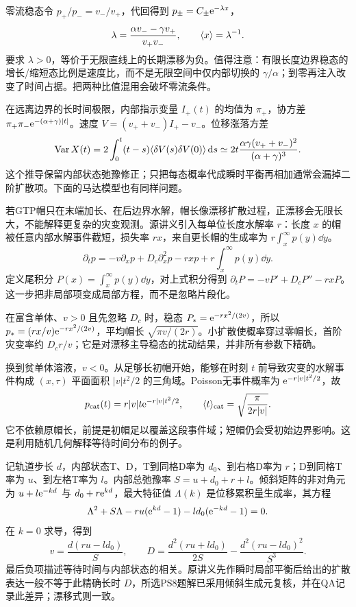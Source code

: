 零流稳态令 $p_+/p_-=v_-/v_+$，代回得到 $p_\pm=C_\pm\mathrm e^{-\lambda x}$，
\[
\lambda=\frac{\alpha v_- -\gamma v_+}{v_+v_-},\qquad
\langle x\rangle=\lambda^{-1}.
\]
要求 $\lambda>0$，等价于无限直线上的长期漂移为负。值得注意：有限长度边界稳态的增长/缩短态比例是速度比，而不是无限空间中仅内部切换的 $\gamma/\alpha$；到零再注入改变了时间占据。把两种比值混用会破坏零流条件。

在远离边界的长时间极限，内部指示变量 $I_+(t)$ 的均值为 $\pi_+$，协方差 $\pi_+\pi_-\mathrm e^{-(\alpha+\gamma)|t|}$。速度 $V=(v_++v_-)I_+-v_-$。位移涨落方差
\[
\operatorname{Var}X(t)=2\int_0^t(t-s)\langle \delta V(s)\delta V(0)\rangle\,\mathrm d s
\simeq2t\frac{\alpha\gamma(v_++v_-)^2}{(\alpha+\gamma)^3}.
\]
这个推导保留内部状态弛豫修正；只把每态概率代成瞬时平衡再相加通常会漏掉二阶扩散项。下面的马达模型也有同样问题。

若GTP帽只在末端加长、在后边界水解，帽长像漂移扩散过程，正漂移会无限长大，不能解释更复杂的灾变观测。源讲义引入每单位长度水解率 $r$：长度 $x$ 的帽被任意内部水解事件截短，损失率 $rx$，来自更长帽的生成率为 $r\int_x^\infty p(y)\dd y$。
\[
\partial_tp=-v\partial_xp+D_c\partial_x^2p-rxp+r\int_x^\infty p(y)\dd y.
\]
定义尾积分 $P(x)=\int_x^\infty p(y)\dd y$，对上式积分得到 $\partial_tP=-vP'+D_cP''-rxP$。这一步把非局部项变成局部方程，而不是忽略片段化。

在富含单体、$v>0$ 且先忽略 $D_c$ 时，稳态 $P_*=\mathrm e^{-rx^2/(2v)}$，所以 $p_*=(rx/v)\mathrm e^{-rx^2/(2v)}$，平均帽长 $\sqrt{\pi v/(2r)}$。小扩散使概率穿过零帽长，首阶灾变率约 $D_cr/v$；它是对漂移主导稳态的扰动结果，并非所有参数下精确。

换到贫单体溶液，$v<0$。从足够长初帽开始，能够在时刻 $t$ 前导致灾变的水解事件构成 $(x,\tau)$ 平面面积 $|v|t^2/2$ 的三角域。Poisson无事件概率为 $\mathrm e^{-r|v|t^2/2}$，故
\[
p_{\rm cat}(t)=r|v|t\mathrm e^{-r|v|t^2/2},\qquad
\langle t\rangle_{\rm cat}=\sqrt{\frac\pi{2r|v|}}.
\]
它不依赖原帽长，前提是初帽足以覆盖这段事件域；短帽仍会受初始边界影响。这是利用随机几何解释等待时间分布的例子。

记轨道步长 $d$，内部状态T、D，T到同格D率为 $d_0$、到右格D率为 $r$；D到同格T率为 $u$、到左格T率为 $l$。内部总弛豫率 $S=u+d_0+r+l$。倾斜矩阵的非对角元为 $u+l\mathrm e^{-kd}$ 与 $d_0+r\mathrm e^{kd}$，最大特征值 $\Lambda(k)$ 是位移累积量生成率，其方程
\[
\Lambda^2+S\Lambda-ru(\mathrm e^{kd}-1)-ld_0(\mathrm e^{-kd}-1)=0.
\]
在 $k=0$ 求导，得到
\[
v=\frac{d(ru-ld_0)}S,\qquad
D=\frac{d^2(ru+ld_0)}{2S}-\frac{d^2(ru-ld_0)^2}{S^3}.
\]
最后负项描述等待时间与内部状态的相关。原讲义先作瞬时局部平衡后给出的扩散表达一般不等于此精确长时 $D$，所选PS8题解已采用倾斜生成元复核，并在QA记录此差异；漂移式则一致。

